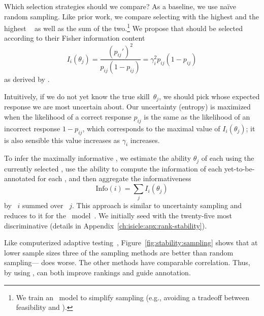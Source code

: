 
Which \itm{} selection strategies should we compare?
As a baseline, we use na\"ive random sampling.
Like prior work, we compare selecting \itms{} with the highest \diff{} and the highest \discability{}~\citep{lalor2019latent} as well as the sum of the two.\footnote{We train an ~model to simplify sampling (e.g., avoiding a tradeoff between feasibility and \discability{}).}
We propose that \itms{} should be selected according to their Fisher information content~\citep{weiss1982info}
\begin{equation}
    \label{eq:info}
    I_i(\theta_j)=\frac{(p_{ij}')^2}{p_{ij}(1-p_{ij})}=\gamma_i^2 p_{ij}(1-p_{ij})
\end{equation} as derived by \citet[p. 70]{lord1968test}.

Intuitively, if we do not yet know the true skill~$\theta_j$, we should pick \itms{} whose expected response we are most uncertain about.
Our uncertainty (entropy) is maximized when the likelihood of a correct response $p_{ij}$ is the same as the likelihood of an incorrect response $1-p_{ij}$, which corresponds to the maximal value of $I_i(\theta_j)$; it is also sensible this value increases as \discability{} $\gamma_i$ increases.

To infer the maximally informative \itms{}, we estimate the ability
$\theta_j$ of each \subj{} using the currently selected \itms{}, use
the ability to compute the information
of each yet-to-be-annotated \itm{} for each \subj{}, and then aggregate the informativeness
\begin{equation}
    \text{Info}(i)=\sum_j I_i(\theta_j)
\end{equation}
by \itm{}~$i$ summed over \subjs{}~$j$.
This approach is similar to uncertainty sampling and reduces to it for the ~model~\citep{lewis1994uncertainty}.
We initially seed with the twenty-five most discriminative \itms{} (details in Appendix~\ref{ch:isicle:apx:rank-stability}).

Like computerized adaptive testing~\citep{moreno1984cat}, Figure~\ref{fig:stability:sampling} shows that at lower sample sizes three of the \irt{} sampling methods are better than random sampling---\diff{} does worse.
The other \irt{} methods have comparable correlation.
Thus, by using \irt{}, \name{} can both improve rankings and guide annotation.
